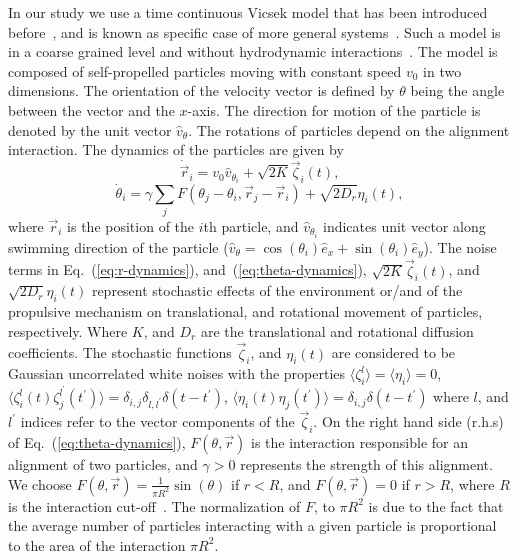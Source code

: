 \documentclass[reprint,floatfix,amsmath,amssymb,aps,pre,showkeys,showpacs,superscriptaddress]{revtex4-1}
\newcommand{\ave}[1]{\langle #1 \rangle}
\newcommand{\hl}[1]{\textcolor{hlcolor}{#1}}
\newcommand{\req}[1]{Eq.~(\ref{#1})}
\newcommand{\reqs}[2]{Eq.~(\ref{#1}), and~(\ref{#2})}
\begin{document}
In our study we use \hl{a time continuous} Vicsek model that has been introduced before~\cite{peruani2008mean}, and is known as specific case of more general systems~\cite{Farrell2012,Yang2015,Morin2015}. \hl{Such a model is in a coarse grained level and without hydrodynamic interactions~\cite{Hernandez-Ortiz2005transport,Underhill2008diffusion}.} The model is composed of self-propelled particles moving with constant speed $v_0$ in two dimensions. The orientation of the velocity vector is defined by $\theta$ being the angle between the vector and the $x$-axis.  The direction for motion of the particle is denoted by the unit vector $\hat{v}_\theta$. The rotations of particles depend on the alignment interaction. The dynamics of the particles are given by
\begin{equation}
\dot{\vec{r}}_i = v_0 \hat{v}_{\theta_i} + \sqrt{2K} \vec{\zeta}_i(t),
\label{eq:r-dynamics}
\end{equation}
\begin{equation}
\dot{\theta}_i = \gamma \sum_j F(\theta_j - \theta_i, \vec{r}_j - \vec{r}_i) + \sqrt{2 D_r} \eta_{i}(t),
\label{eq:theta-dynamics}
\end{equation}
where $\vec{r}_i$ is the position of the $i$th particle, and $\hat{v}_{\theta_i}$ indicates unit vector along swimming direction of the particle ($\hat{v}_{\theta} = \cos(\theta_i) \hat{e}_x + \sin(\theta_i) \hat{e}_y$). The noise terms in \reqs{eq:r-dynamics}{eq:theta-dynamics}, $\sqrt{2K} \vec{\zeta}_i(t)$,  and $\sqrt{2 D_r} \eta_{i}(t)$ represent stochastic \hl{effects of the environment or/and  of the propulsive mechanism} on translational, and rotational movement of particles\hl{,} respectively. Where $K$, and \hl{$D_r$} are the translational and rotational diffusion coefficients. The stochastic functions $\vec{\zeta}_i$, and $\eta_{i}(t)$ are \hl{considered to be} Gaussian uncorrelated white noises with the properties $\ave{\zeta_i^l} = \ave{\eta_i} = 0$, $\ave{\zeta_i^l(t) \zeta_j^{l^\prime}(t^\prime)} = \delta_{i,j} \delta_{l,l^\prime} \delta(t - t^\prime)$, $\ave{\eta_i(t) \eta_j(t^\prime)} = \delta_{i,j} \delta(t - t^\prime)$ where $l$, and $l^\prime$ indices refer to the \hl{vector} components of the $\vec{\zeta}_i$. On the right hand side (r.h.s) of \req{eq:theta-dynamics}, $F(\theta,\vec{r})$ is the interaction responsible for \hl{an} alignment of two particles, and \hl{$\gamma > 0$} represents the strength of this alignment. We choose $F(\theta,\vec{r}) = \frac{1}{\pi R^2} \sin \left( \theta \right)$ if $r<R$, and $F(\theta,\vec{r}) = 0$ if $r>R$, where $R$ is the interaction cut-off~\cite{Farrell2012}. The normalization of $F$, to $\pi R^2$ is due to the fact that the average number of particles interacting with a given particle is proportional to \hl{the} area of \hl{the} interaction $\pi R^2$.
\end{document}
